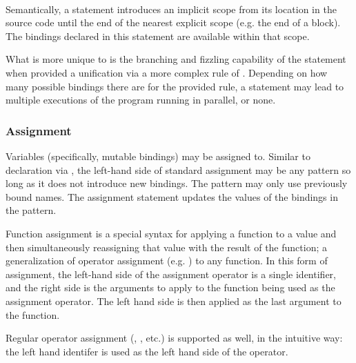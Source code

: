 \begin{bnf*}
     \\
\end{bnf*}

Semantically, a  statement introduces an implicit scope from its location
in the source code until the end of the nearest explicit scope (e.g. the end of a block).
The bindings declared in this statement are available within that scope.

What is more unique to \Trilogy{} is the branching and fizzling capability of the
 statement when provided a unification via a more complex rule of \Law{}.
Depending on how many possible bindings there are for the provided rule, a 
statement may lead to multiple executions of the program running in parallel, or none.

\begin{prooftree}
\end{prooftree}

\subsubsection{Assignment}

Variables (specifically, mutable bindings) may be assigned to. Similar to
declaration via , the left-hand side of standard assignment may be
any pattern so long as it does not introduce new bindings. The pattern may only
use previously bound names. The assignment statement updates the values of the
bindings in the pattern.

Function assignment is a special syntax for applying a function to a value and
then simultaneously reassigning that value with the result of the function; a
generalization of operator assignment (e.g. \op{+=}) to any function. In this form
of assignment, the left-hand side of the assignment operator is a single identifier,
and the right side is the arguments to apply to the function being used as the
assignment operator. The left hand side is then applied as the last argument to
the function.

Regular operator assignment (\op{+=}, \op{-=}, etc.) is supported as well, in the
intuitive way: the left hand identifer is used as the left hand side of the operator.


